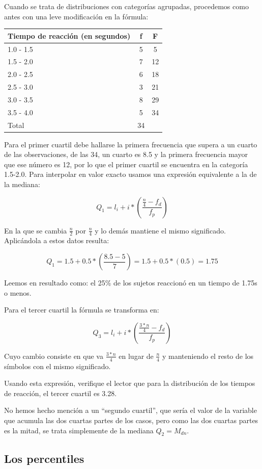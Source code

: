 \documentclass[]{book}
\begin{document}
Cuando se trata de distribuciones con categorías agrupadas, procedemos
como antes con una leve modificación en la fórmula:

\begin{longtable}[]{@{}lcc@{}}
\toprule
Tiempo de reacción (en segundos) & f & F\tabularnewline
\midrule
\endhead
1.0 - 1.5 & 5 & 5\tabularnewline
1.5 - 2.0 & 7 & 12\tabularnewline
2.0 - 2.5 & 6 & 18\tabularnewline
2.5 - 3.0 & 3 & 21\tabularnewline
3.0 - 3.5 & 8 & 29\tabularnewline
3.5 - 4.0 & 5 & 34\tabularnewline
Total & 34 &\tabularnewline
\bottomrule
\end{longtable}

Para el primer cuartil debe hallarse la primera frecuencia que supera a
un cuarto de las observaciones, de las 34, un cuarto es 8.5 y la primera
frecuencia mayor que ese número es 12, por lo que el primer cuartil se
encuentra en la categoría 1.5-2.0. Para interpolar en valor exacto
usamos una expresión equivalente a la de la mediana:

\[Q_{1} = l_{i} + i*\left( \frac{\frac{n}{4} - f_{d}}{f_{p}} \right)\]

En la que se cambia \(\frac{n}{2}\) por \(\frac{n}{4}\) y lo demás mantiene
el mismo significado. Aplicándola a estos datos resulta:

\[Q_{1} = 1.5 + 0.5*\left( \frac{8.5 - 5}{7} \right) = 1.5 + 0.5*\left( 0.5 \right) = 1.75\]

Leemos en resultado como: el 25\% de los sujetos reaccionó en un tiempo
de 1.75s o menos.

Para el tercer cuartil la fórmula se transforma en:

\[Q_{3} = l_{i} + i*\left( \frac{\frac{3*n}{4} - f_{d}}{f_{p}} \right)\]

Cuyo cambio consiste en que va \(\frac{3*n}{4}\) en lugar de \(\frac{n}{4}\)
y manteniendo el resto de los símbolos con el mismo significado.

Usando esta expresión, verifique el lector que para la distribución de
los tiempos de reacción, el tercer cuartil es 3.28.

No hemos hecho mención a un ``segundo cuartil'', que sería el valor de la
variable que acumula las dos cuartas partes de los casos, pero como las
dos cuartas partes es la mitad, se trata simplemente de la mediana
\(Q_{2} = M_{dn}\).

\hypertarget{los-percentiles}{%
\subsection{Los percentiles}\label{los-percentiles}}
\end{document}
